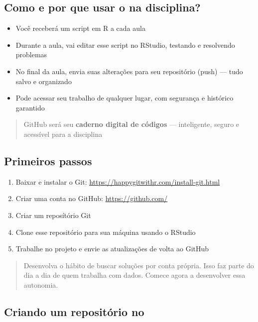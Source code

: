 \documentclass[
  letterpaper,
  DIV=11,
  numbers=noendperiod]{scrartcl}
\begin{document}
\subsection{\texorpdfstring{Como e por que usar o na
disciplina?}{Como e por que usar o  na disciplina?}}\label{como-e-por-que-usar-o-na-disciplina}

\begin{itemize}
\item
  Você receberá um script em R a cada aula
\item
  Durante a aula, vai editar esse script no RStudio, testando e
  resolvendo problemas
\item
  No final da aula, envia suas alterações para seu repositório (push)
  --- tudo salvo e organizado
\item
  Pode acessar seu trabalho de qualquer lugar, com segurança e histórico
  garantido
\end{itemize}

\begin{quote}
GitHub será seu \textbf{caderno digital de códigos} --- inteligente,
seguro e acessível para a disciplina
\end{quote}

\subsection{Primeiros passos}\label{primeiros-passos}

\begin{enumerate}
\def\labelenumi{\arabic{enumi}.}
\item
  Baixar e instalar o Git:
  \url{https://happygitwithr.com/install-git.html}
\item
  Criar uma conta no GitHub: \url{https://github.com/}
\item
  Criar um reposítório Git
\item
  Clone esse repositório para sua máquina usando o RStudio
\item
  Trabalhe no projeto e envie as atualizações de volta ao GitHub
\end{enumerate}

\begin{quote}
Desenvolva o hábito de buscar soluções por conta própria. Isso faz parte
do dia a dia de quem trabalha com dados. Comece agora a desenvolver essa
autonomia.
\end{quote}

\subsection{\texorpdfstring{Criando um repositório no
}{Criando um repositório  no }}\label{criando-um-reposituxf3rio-no}
\end{document}
